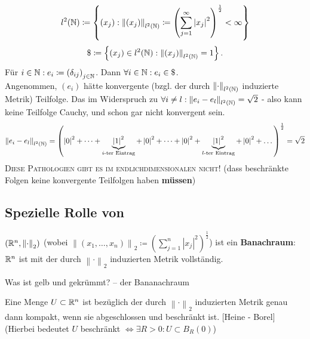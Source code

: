 \begin{subexample*}
	\[
		l^2(\mathbb{N} ) \coloneqq \left\{ (x_j) : \left\| (x_j) \right\| _{l^2(\mathbb{N} )} \coloneqq \left( \sum_{j=1}^{\infty} \left| x_j \right| ^2 \right) ^{\frac{ 1 }{ 2 } } < \infty \right\} 
	\]
	\[
		\mathdollar \coloneqq \left\{ (x_j) \in l^2(\mathbb{N} ) : \left\| (x_j) \right\| _{l^2(\mathbb{N} )} = 1 \right\} .
	\]
	Für $ i \in \mathbb{N} : e_i \coloneqq \left( \delta_{ij}  \right) _{j \in \mathbb{N} }  $. 
	Dann $ \forall i \in \mathbb{N} : e_i \in \mathdollar $.\\
	Angenommen, $ (e_i) $ hätte konvergente (bzgl. der durch $ \left\| \cdot  \right\| _{l^2(\mathbb{N} )}  $ induzierte Metrik) Teilfolge.
	Das im Widerspruch zu
	$ \forall  i \neq l : \left\| e_i - e_l \right\| _{l^2(\mathbb{N} )} = \sqrt{2}  $ - also kann keine Teilfolge Cauchy, und schon gar nicht konvergent sein.
	\[
		\left\| e_i - e_l \right\| _{l^2(\mathbb{N} )} = \left( \left| 0 \right|^2 + \dotsb + \underbrace{\left| 1 \right| ^2}_{i\text{-ter Eintrag} } + \left| 0 \right|^2 + \dotsb + \left| 0 \right|^2  + \underbrace{\left| 1 \right| ^2}_{l\text{-ter Eintrag} } + \left| 0 \right| ^2 + \dotsc \right) ^{\frac{ 1 }{ 2 } } = \sqrt{2} 
	\]
	{\color{gadse-red}\textsc{Diese Pathologien gibt es im endlichdimensionalen nicht!}} (dass beschränkte Folgen keine konvergente Teilfolgen haben \textbf{müssen})
\end{subexample*}

\subsection{Spezielle Rolle von }
$ \left( \mathbb{R} ^n, \left\| \cdot  \right\| _2 \right)  $ (wobei $ \left\| (x_1, \dotsc, x_n) \right\| _2 \coloneqq \left( \sum_{j=1}^{n} \left| x_j \right| ^2 \right) ^{\frac{ 1 }{ 2 } }  $) ist ein \textbf{Banachraum}: $ \mathbb{R} ^n $ ist mit der durch $ \left\| \cdot  \right\| _2 $ induzierten Metrik vollständig.

Was ist gelb und gekrümmt? -- der Bananachraum

\begin{subtheorem}
	Eine Menge $ U \subset \mathbb{R} ^n $ ist bezüglich der durch $ \left\| \cdot  \right\| _2 $ induzierten Metrik genau dann kompakt, wenn sie abgeschlossen und beschränkt ist. {[Heine - Borel]}\\
	(Hierbei bedeutet $ U $ beschränkt $ \iff  \exists R > 0 : U \subset B_{R}(0)  $)
\end{subtheorem}

